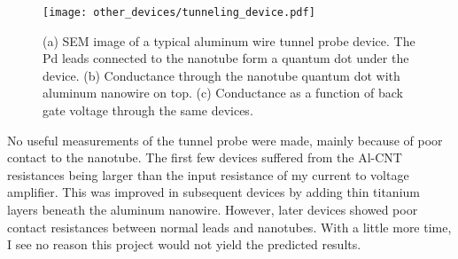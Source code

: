 \begin{figure}
    \centering
    \texttt{[image: other\_devices/tunneling\_device.pdf]}
    \caption{(a) SEM image of a typical aluminum wire tunnel probe device. The Pd leads connected to the nanotube form a quantum dot under the device. (b) Conductance through the nanotube quantum dot with aluminum nanowire on top. (c) Conductance as a function of back gate voltage through the same devices.}
    \label{fig:tunneling_device}
\end{figure}

No useful measurements of the tunnel probe were made, mainly because of poor contact to the nanotube. The first few devices suffered from the Al-CNT resistances being larger than the input resistance of my current to voltage amplifier. This was improved in subsequent devices by adding thin titanium layers beneath the aluminum nanowire. However, later devices showed poor contact resistances between normal leads and nanotubes. With a little more time, I see no reason this project would not yield the predicted results.